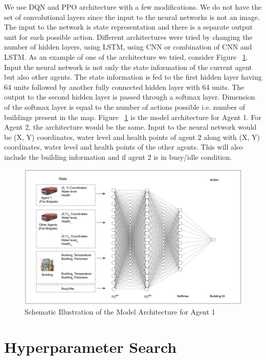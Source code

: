 \documentclass[12pt]{report}
\begin{document}
We use DQN and PPO architecture with a few modifications. We do not have the set of convolutional layers since the input to the neural networks is not an image. The input to the network is state representation and there is a separate output unit for each possible action. Different architectures were tried by changing the number of hidden layers, using LSTM, using CNN or combination of CNN and LSTM. As an example of one of the architecture we tried, consider Figure ~\ref{fig:27}. Input the neural network is not only the state information of the current agent but also other agents. The state information is fed to the first hidden layer having 64 units followed by another fully connected hidden layer with 64 units. The output to the second hidden layer is passed through a softmax layer. Dimension of the softmax layer is equal to the number of actions possible i.e. number of buildings present in the map. Figure ~\ref{fig:27} is the model architecture for Agent 1. For Agent 2, the architecture would be the same. Input to the neural network would be (X, Y) coordinates, water level and health points of agent 2 along with (X, Y) coordinates, water level and health points of the other agents. This will also include the building information and if agent 2 is in busy/idle condition. 

\begin{figure}[!h]
    \centering
    \includegraphics[width=17cm]{27}
    \caption{Schematic Illustration of the Model Architecture for Agent 1}
    \label{fig:27}
\end{figure}

\section{Hyperparameter Search}
\end{document}
